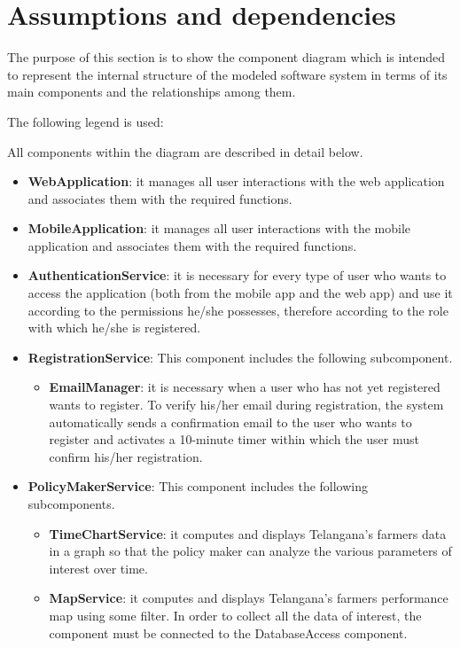 \section{Assumptions and dependencies}
The purpose of this section is to show the component diagram which is intended to represent the internal structure of the modeled software system in terms of its main components and the relationships among them.

The following legend is used:


All components within the diagram are described in detail below.
\begin{itemize}

\item \textbf{WebApplication}: it manages all user interactions with the web application and associates them with the required functions.

\item \textbf{MobileApplication}: it manages all user interactions with the mobile application and associates them with the required functions.

\item \textbf{AuthenticationService}: it is necessary for every type of user who wants to access the application (both from the mobile app and the web app) and use it according to the permissions he/she possesses, therefore according to the role with which he/she is registered.

\item \textbf{RegistrationService}: This component includes the following subcomponent.

\begin{itemize}

\item \textbf{EmailManager}: it is necessary when a user who has not yet registered wants to register. To verify his/her email during registration, the system automatically sends a confirmation email to the user who wants to register and activates a 10-minute timer within which the user must confirm his/her registration.
\end{itemize}
\item \textbf{PolicyMakerService}: This component includes the following subcomponents.

\begin{itemize}
    \item \textbf{TimeChartService}: it computes and displays Telangana’s farmers data in a graph so that the policy maker can analyze the various parameters of interest over time.
    \item \textbf{MapService}: it computes and displays Telangana’s farmers performance map using some filter. In order to collect all the data of interest, the component must be connected to the DatabaseAccess component. 
\end{itemize}


\end{itemize}
